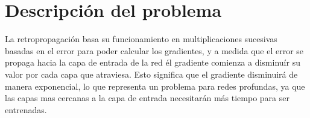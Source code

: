 








\section{Descripción del problema}
La retropropagación basa su funcionamiento en multiplicaciones sucesivas basadas en el error para poder calcular los gradientes, y a medida que el error se propaga hacia la capa de entrada de la red él gradiente comienza a disminuír su valor por cada capa que atraviesa. Esto significa que el gradiente disminuirá de manera exponencial, lo que representa un problema para redes profundas, ya que las capas mas cercanas a la capa de entrada necesitarán más tiempo para ser entrenadas.

